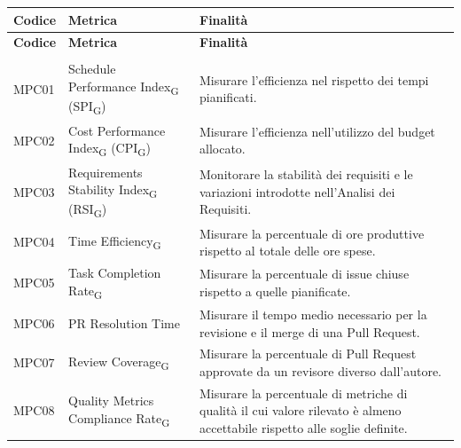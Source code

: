 \begin{xltabular}{\textwidth}{
    >{\raggedright\arraybackslash}p{2.5cm}
    >{\raggedright\arraybackslash}X
    >{\raggedright\arraybackslash}p{6cm}
}
    \toprule
    \textbf{Codice} & \textbf{Metrica} & \textbf{Finalità} \\
    \midrule
    \endfirsthead

    \toprule
    \textbf{Codice} & \textbf{Metrica} & \textbf{Finalità} \\
    \midrule
    \endhead

    \midrule
     \\
    \endfoot

    \bottomrule
    \endlastfoot

    MPC01
    & Schedule Performance Index\textsubscript{G} (SPI\textsubscript{G})
    & Misurare l'efficienza nel rispetto dei tempi pianificati. \\

    MPC02
    & Cost Performance Index\textsubscript{G} (CPI\textsubscript{G})
    & Misurare l'efficienza nell'utilizzo del budget allocato. \\

    MPC03
    & Requirements Stability Index\textsubscript{G} (RSI\textsubscript{G})
    & Monitorare la stabilità dei requisiti e le variazioni introdotte nell'Analisi dei Requisiti. \\

    MPC04
    & Time Efficiency\textsubscript{G}
    & Misurare la percentuale di ore produttive rispetto al totale delle ore spese. \\

    MPC05
    & Task Completion Rate\textsubscript{G}
    & Misurare la percentuale di issue chiuse rispetto a quelle pianificate. \\

    MPC06
    & PR Resolution Time
    & Misurare il tempo medio necessario per la revisione e il merge di una Pull Request. \\

    MPC07
    & Review Coverage\textsubscript{G}
    & Misurare la percentuale di Pull Request approvate da un revisore diverso dall'autore. \\

    MPC08
    & Quality Metrics Compliance Rate\textsubscript{G}
    & Misurare la percentuale di metriche di qualità il cui valore rilevato è almeno accettabile rispetto alle soglie definite. \\

\end{xltabular}

